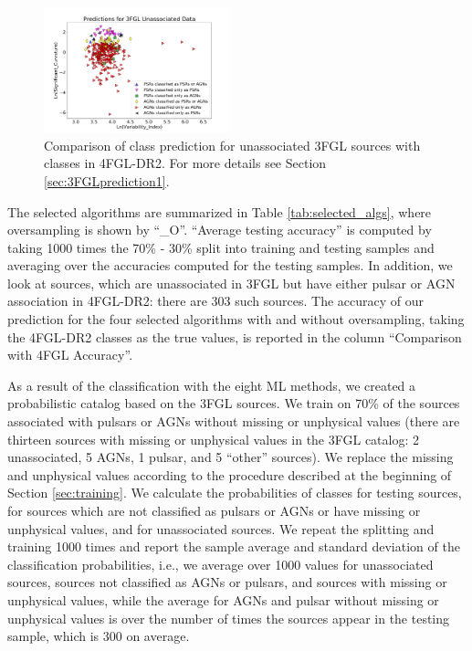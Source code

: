 \begin{figure}[h]
\centering
\includegraphics[width=0.48\textwidth]{plots/3FGL_unassoc_vs_4FGL-DR2_assoc.pdf}
\caption{Comparison of class prediction for unassociated 3FGL sources with classes in 4FGL-DR2. 
For more details see Section \ref{sec:3FGLprediction1}.}
\label{fig:3FGL_vs_4FGL_classes}
\end{figure}

The selected algorithms are summarized in Table \ref{tab:selected_algs}, where oversampling is shown by ``\_O''.
``Average testing accuracy'' is computed by taking 1000 times the 70\% - 30\% split into training and testing samples and averaging over the 
accuracies computed for the testing samples.
In addition, we look at sources, which are unassociated in 3FGL but have either pulsar or AGN association in 4FGL-DR2: there are 303 such sources.
The accuracy of our prediction for the four selected algorithms with and without oversampling, taking the 4FGL-DR2 classes as the true values, is reported in the column ``Comparison with 4FGL Accuracy''.

As a result of the classification with the eight ML methods,
we created a probabilistic catalog based on the 3FGL sources.
We train on 70\% of the sources associated with pulsars or AGNs without missing or unphysical values 
(there are thirteen sources with missing or unphysical values in the 3FGL catalog: 2 unassociated, 5 AGNs, 1 pulsar, and 5 ``other'' sources).
We replace the missing and unphysical values according to the procedure described at the beginning of Section \ref{sec:training}.
We calculate the probabilities of classes for testing sources, for sources which are not classified as pulsars or AGNs or have missing or unphysical values, and for unassociated sources.
We repeat the splitting and training 1000 times and report the sample average and standard deviation of the classification probabilities,
i.e., we average over 1000 values for unassociated sources, sources not classified as AGNs or pulsars, and sources with missing or unphysical values,
while the average for AGNs and pulsar without missing or unphysical values is over the number of times the sources appear in the testing sample, which is 300 on average.


